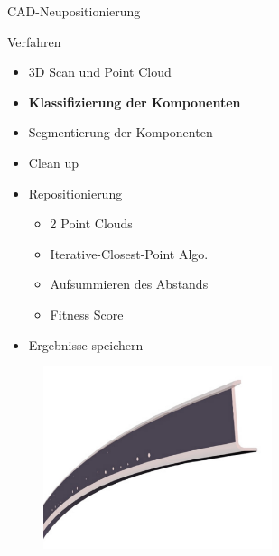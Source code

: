 \begin{frame}{CAD-Neupositionierung}
    \begin{minipage}[m]{0.49\textwidth}
    \begin{block}{Verfahren}
        \begin{itemize}
            \item 3D Scan und Point Cloud
            \item \textbf{Klassifizierung der Komponenten}
            \item Segmentierung der Komponenten
            \item Clean up
            \item Repositionierung
            \begin{itemize}
                \item 2 Point Clouds
                \item Iterative-Closest-Point Algo.
                \item Aufsummieren des Abstands
                \item Fitness Score
            \end{itemize}
            \item Ergebnisse speichern
        \end{itemize}
    \end{block}
    \end{minipage}
    \begin{minipage}[m]{0.49\textwidth}
      \begin{figure}
          \includegraphics[width=190pt]{img_niklas/classification_frame.PNG}
          \label{fig:my_label}
      \end{figure}
    \end{minipage}
\end{frame}

